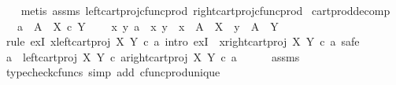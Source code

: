 \begin{isabellebody}
%
\isadelimproof
\ \ %
\endisadelimproof
%
\isatagproof
{}\isamarkupfalse%
\ {\isacharparenleft}{\kern0pt}metis\ assms\ left{\isacharunderscore}{\kern0pt}cart{\isacharunderscore}{\kern0pt}proj{\isacharunderscore}{\kern0pt}cfunc{\isacharunderscore}{\kern0pt}prod\ right{\isacharunderscore}{\kern0pt}cart{\isacharunderscore}{\kern0pt}proj{\isacharunderscore}{\kern0pt}cfunc{\isacharunderscore}{\kern0pt}prod{\isacharparenright}{\kern0pt}%
\endisatagproof
{\isafoldproof}%
%
\isadelimproof
\isanewline
%
\endisadelimproof
\isanewline
{}\isamarkupfalse%
\ cart{\isacharunderscore}{\kern0pt}prod{\isacharunderscore}{\kern0pt}decomp{\isacharcolon}{\kern0pt}\isanewline
\ \ \ {\isachardoublequoteopen}a\ {\isacharcolon}{\kern0pt}\ A\ {\isasymrightarrow}\ X\ {\isasymtimes}\isactrlsub c\ Y{\isachardoublequoteclose}\isanewline
\ \ \ {\isachardoublequoteopen}{\isasymexists}\ x\ y{\isachardot}{\kern0pt}\ a\ {\isacharequal}{\kern0pt}\ {\isasymlangle}x{\isacharcomma}{\kern0pt}\ y{\isasymrangle}\ {\isasymand}\ x\ {\isacharcolon}{\kern0pt}\ A\ {\isasymrightarrow}\ X\ {\isasymand}\ y\ {\isacharcolon}{\kern0pt}\ A\ {\isasymrightarrow}\ Y{\isachardoublequoteclose}\isanewline
%
\isadelimproof
%
\endisadelimproof
%
\isatagproof
{}\isamarkupfalse%
\ {\isacharparenleft}{\kern0pt}rule\ exI{\isacharbrackleft}{\kern0pt}\ x{\isacharequal}{\kern0pt}{\isachardoublequoteopen}left{\isacharunderscore}{\kern0pt}cart{\isacharunderscore}{\kern0pt}proj\ X\ Y\ {\isasymcirc}\isactrlsub c\ a{\isachardoublequoteclose}{\isacharbrackright}{\kern0pt}{\isacharcomma}{\kern0pt}\ intro\ exI\ {\isacharbrackleft}{\kern0pt}\ x{\isacharequal}{\kern0pt}{\isachardoublequoteopen}right{\isacharunderscore}{\kern0pt}cart{\isacharunderscore}{\kern0pt}proj\ X\ Y\ {\isasymcirc}\isactrlsub c\ a{\isachardoublequoteclose}{\isacharbrackright}{\kern0pt}{\isacharcomma}{\kern0pt}\ safe{\isacharparenright}{\kern0pt}\isanewline
\ \ \isamarkupfalse%
\ {\isachardoublequoteopen}a\ {\isacharequal}{\kern0pt}\ {\isasymlangle}left{\isacharunderscore}{\kern0pt}cart{\isacharunderscore}{\kern0pt}proj\ X\ Y\ {\isasymcirc}\isactrlsub c\ a{\isacharcomma}{\kern0pt}right{\isacharunderscore}{\kern0pt}cart{\isacharunderscore}{\kern0pt}proj\ X\ Y\ {\isasymcirc}\isactrlsub c\ a{\isasymrangle}{\isachardoublequoteclose}\isanewline
\ \ \ \ \isamarkupfalse%
\ assms\ \isamarkupfalse%
\ {\isacharparenleft}{\kern0pt}typecheck{\isacharunderscore}{\kern0pt}cfuncs{\isacharcomma}{\kern0pt}\ simp\ add{\isacharcolon}{\kern0pt}\ cfunc{\isacharunderscore}{\kern0pt}prod{\isacharunderscore}{\kern0pt}unique{\isacharparenright}{\kern0pt}\isanewline

\end{isabellebody}
